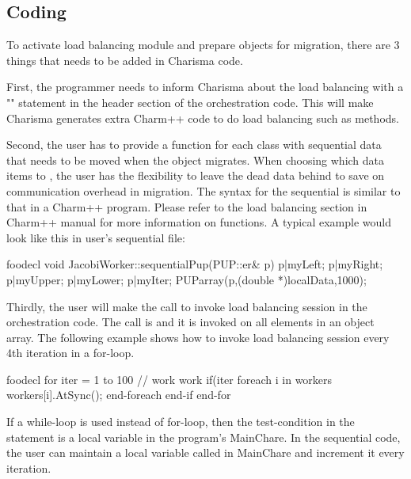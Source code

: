 \subsection{Coding}

To activate load balancing module and prepare objects for migration, there are 3
things that needs to be added in Charisma code. 

First, the programmer needs to inform Charisma about the load balancing with a
"" statement in the header section of the orchestration code.
This will make Charisma generates extra Charm++ code to do load balancing such
as  methods.

Second, the user has to provide a  function for each class with
sequential data that needs to be moved when the object migrates. When choosing
which data items to , the user has the flexibility to leave the dead
data behind to save on communication overhead in migration. The syntax for the
sequential  is similar to that in a Charm++ program. Please refer to
the load balancing section in Charm++ manual for more information on 
functions. A typical example would look like this in user's sequential 
file: 

\begin{SaveVerbatim}{foodecl}
  void JacobiWorker::sequentialPup(PUP::er& p){
    p|myLeft; p|myRight; p|myUpper; p|myLower;
    p|myIter;
    PUParray(p,(double *)localData,1000);
  }
\end{SaveVerbatim}
\vspace{0.1in}
\vspace{0.1in}

Thirdly, the user will make the call to invoke load balancing session in the
orchestration code. The call is  and it is invoked on all
elements in an object array. The following example shows how to invoke load
balancing session every 4th iteration in a for-loop. 

\begin{SaveVerbatim}{foodecl}
  for iter = 1 to 100
    // work work
    if(iter %
      foreach i in workers
        workers[i].AtSync();
      end-foreach
    end-if
  end-for
\end{SaveVerbatim}
\vspace{0.1in}
\vspace{0.1in}

If a while-loop is used instead of for-loop, then the test-condition in the
 statement is a local variable in the program's MainChare. In the
sequential code, the user can maintain a local variable called  in
MainChare and increment it every iteration. 


